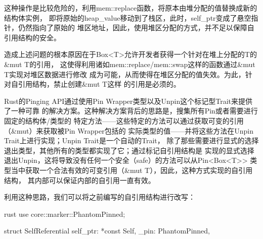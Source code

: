 \begin{warn}
这种操作是比较危险的，利用mem::replace函数，将原本由堆分配的值替换成新的结构体实例，
即将原始的heap\_value移动到了栈区，此时，self\_ptr变成了悬空指针，仍然指向了原始的
堆区地址，因此，使用堆区分配的方式，并不足以保障自引用结构的安全。
\end{warn}

造成上述问题的根本原因在于Box<T>允许开发者获得一个针对在堆上分配的T的\&mut T的引用，
这使得利用诸如mem::replace/mem::swap这样的函数通过\&mut T实现对堆区数据进行修改
成为可能，从而使得在堆区分配的值失效。为此，针对自引用结构，禁止创建\&mut T这样
的引用是必须的。

Rust的Pinging API通过使用Pin Wrapper类型以及Unpin这个标记型Trait来提供了一种可靠
的解决方案。这种解决方案背后的思路是，搜集所有Pin或者需要进行固定的结构体/类型的
特定方法——这些特定的方法可以通过获取可变的引用（\&mut）来获取被Pin Wrapper包括的
实际类型的值——并将这些方法在Unpin Trait上进行实现；Unpin Trait是一个自动的Trait，
除了那些需要进行显式的选择退出类型，其他所有的类型都实现了它；通过标记自引用结构是
实现的显式选择退出Unpin，这将导致没有任何一个安全（safe）的方法可以从Pin<Box<T>>
类型当中获取一个合法有效的可变引用（\&mut T），因此，这种方式实现的自引用结构，
其内部可以保证内部的自引用一直有效。

利用这种思路，我们可以将之前编写的自引用结构进行改写：
\begin{code-block}{rust}
use core::marker::PhantomPinned;

struct SelfReferential {
    self_ptr: *const Self,
    _pin: PhantomPinned,
}
\end{code-block}


